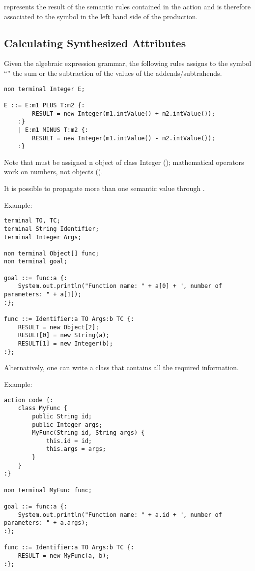  represents the result of the semantic rules contained in the action and is therefore associated to the symbol in the left hand side of the production.

\subsection{Calculating Synthesized Attributes}
Given the algebraic expression grammar, the following rules assigns to the symbol ``'' the sum or the subtraction of the values of the addends/subtrahends.
\begin{lstlisting}[frame=single]
non terminal Integer E;

E ::= E:m1 PLUS T:m2 {:
        RESULT = new Integer(m1.intValue() + m2.intValue());
    :}
    | E:m1 MINUS T:m2 {:
        RESULT = new Integer(m1.intValue() - m2.intValue());
    :}
\end{lstlisting}
Note that  must be assigned n object of class Integer (); mathematical operators work on numbers, not objects ().

It is possible to propagate more than one semantic value through .

Example:
\begin{lstlisting}[frame=single]
terminal TO, TC;
terminal String Identifier;
terminal Integer Args;

non terminal Object[] func;
non terminal goal;

goal ::= func:a {:
    System.out.println("Function name: " + a[0] + ", number of parameters: " + a[1]);
:};

func ::= Identifier:a TO Args:b TC {:
    RESULT = new Object[2];
    RESULT[0] = new String(a);
    RESULT[1] = new Integer(b);
:};
\end{lstlisting}
Alternatively, one can write a class that contains all the required information.

Example:
\begin{lstlisting}[frame=single]
action code {:
    class MyFunc {
        public String id;
        public Integer args;
        MyFunc(String id, String args) {
            this.id = id;
            this.args = args;
        }
    }
:}

non terminal MyFunc func;

goal ::= func:a {:
    System.out.println("Function name: " + a.id + ", number of parameters: " + a.args);
:};

func ::= Identifier:a TO Args:b TC {:
    RESULT = new MyFunc(a, b);
:};
\end{lstlisting}

